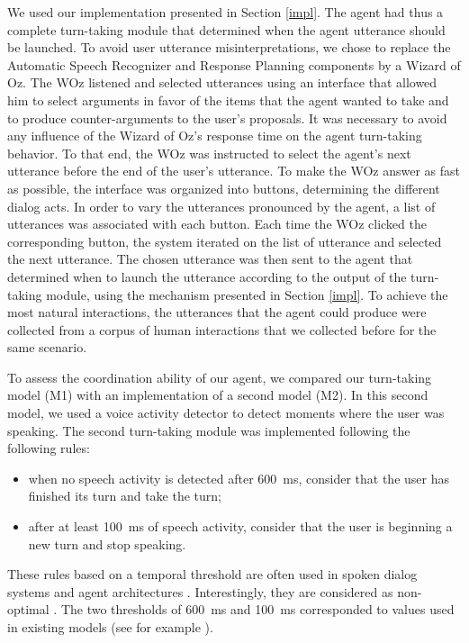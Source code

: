 \documentclass[twocolumn]{svjour3}
\begin{document}
We used our implementation presented in Section \ref{impl}. The agent had thus a complete turn-taking module that determined when the agent utterance should be launched. To avoid user utterance misinterpretations, we chose to replace the Automatic Speech Recognizer and Response Planning components by a Wizard of Oz. The WOz listened and selected utterances using an interface that allowed him to select arguments in favor of the items that the agent wanted to take and to produce counter-arguments to the user's proposals. It was necessary to avoid any influence of the Wizard of Oz's response time on the agent turn-taking behavior. To that end, the WOz was instructed to select the agent's next utterance before the end of the user's utterance. 
To make the WOz answer as fast as possible, the interface was organized into buttons, determining the different dialog acts. In order to vary the utterances pronounced by the agent, a list of utterances was associated with each button. Each time the WOz clicked the corresponding button, the system iterated on the list of utterance and selected the next utterance. The chosen utterance was then sent to the agent that determined when to launch the utterance according to the output of the turn-taking module, using the mechanism presented in Section \ref{impl}. To achieve the most natural interactions, the utterances that the agent could produce were collected from a corpus of human interactions that we collected before for the same scenario.

To assess the coordination ability of our agent, we compared our turn-taking model (M1) with an implementation of a second model (M2). 
In this second model, we used a voice activity detector to detect moments where the user was speaking. 
The second turn-taking module was implemented following the following rules: 
\begin{itemize}
\item when no speech activity is detected after 600~ms, consider that the user has finished its turn and take the turn;
\item after at least 100~ms of speech activity, consider that the user is beginning a new turn and stop speaking. 
\end{itemize} 
These rules based on a temporal threshold are often used in spoken dialog systems and agent architectures \citep{ward_root_2005}. Interestingly, they are considered as non-optimal \citep{ward_root_2005}. The two thresholds of 600~ms and 100~ms corresponded to values used in existing models (see for example \citep{ferrer_is_2002}). 
\end{document}

